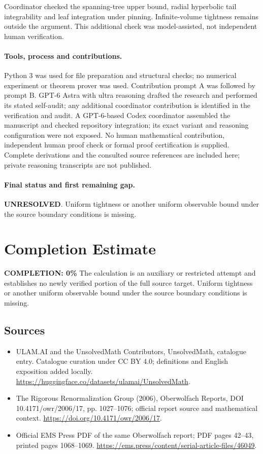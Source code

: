 \documentclass[11pt]{article}
\begin{document}
Coordinator checked the spanning-tree upper bound, radial hyperbolic tail integrability and leaf integration under pinning. Infinite-volume tightness remains outside the argument. This additional check was model-assisted, not independent human verification.

\paragraph{Tools, process and contributions.}
Python 3 was used for file preparation and structural checks; no numerical experiment or theorem prover was used. Contribution prompt A was followed by prompt B. GPT-6 Astra with ultra reasoning drafted the research and performed its stated self-audit; any additional coordinator contribution is identified in the verification and audit. A GPT-6-based Codex coordinator assembled the manuscript and checked repository integration; its exact variant and reasoning configuration were not exposed. No human mathematical contribution, independent human proof check or formal proof certification is supplied. Complete derivations and the consulted source references are included here; private reasoning transcripts are not published.

\paragraph{Final status and first remaining gap.}
\textbf{UNRESOLVED}. Uniform tightness or another uniform observable bound under the source boundary conditions is missing.

\section{Completion Estimate}
\noindent\textbf{COMPLETION: 0\%}
The calculation is an auxiliary or restricted attempt and establishes no newly verified portion of the full source target. Uniform tightness or another uniform observable bound under the source boundary conditions is missing.

\subsection{Sources}
\begin{itemize}
\item[\hypertarget{source:statement:1}{S1}] ULAM.AI and the UnsolvedMath Contributors, UnsolvedMath, catalogue entry. Catalogue curation under CC BY 4.0; definitions and English exposition added locally.
\url{https://huggingface.co/datasets/ulamai/UnsolvedMath}.
\item[\hypertarget{source:statement:2}{S2}] The Rigorous Renormalization Group (2006), Oberwolfach Reports, DOI 10.4171/owr/2006/17, pp. 1027--1076; official report source and mathematical context.
\url{https://doi.org/10.4171/owr/2006/17}.
\item[\hypertarget{source:statement:3}{S3}] Official EMS Press PDF of the same Oberwolfach report; PDF pages 42--43, printed pages 1068--1069.
\url{https://ems.press/content/serial-article-files/46049}.
\end{itemize}
\label{end:statement}
\end{document}
